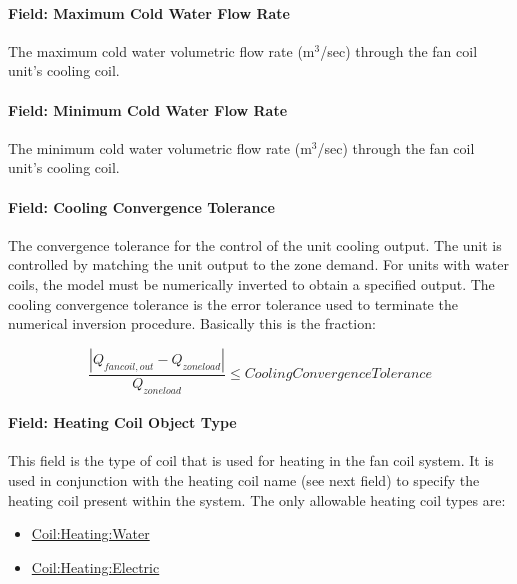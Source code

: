 \paragraph{Field: Maximum Cold Water Flow Rate}\label{field-maximum-cold-water-flow-rate-000}

The maximum cold water volumetric flow rate (m\(^{3}\)/sec) through the fan coil unit's cooling coil.

\paragraph{Field: Minimum Cold Water Flow Rate}\label{field-minimum-cold-water-flow-rate-000}

The minimum cold water volumetric flow rate (m\(^{3}\)/sec) through the fan coil unit's cooling coil.

\paragraph{Field: Cooling Convergence Tolerance}\label{field-cooling-convergence-tolerance-000}

The convergence tolerance for the control of the unit cooling output. The unit is controlled by matching the unit output to the zone demand. For units with water coils, the model must be numerically inverted to obtain a specified output. The cooling convergence tolerance is the error tolerance used to terminate the numerical inversion procedure. Basically this is the fraction:

\begin{equation}
\frac{{\left| {{Q_{fancoil,out}} - {Q_{zoneload}}} \right|}}{{{Q_{zoneload}}}} \le CoolingConvergenceTolerance
\end{equation}

\paragraph{Field: Heating Coil Object Type}\label{field-heating-coil-object-type-003}

This field is the type of coil that is used for heating in the fan coil system. It is used in conjunction with the heating coil name (see next field) to specify the heating coil present within the system. The only allowable heating coil types are:

\begin{itemize}
\item
  \hyperref[coilheatingwater]{Coil:Heating:Water}
\item
  \hyperref[coilheatingelectric]{Coil:Heating:Electric}
\end{itemize}

